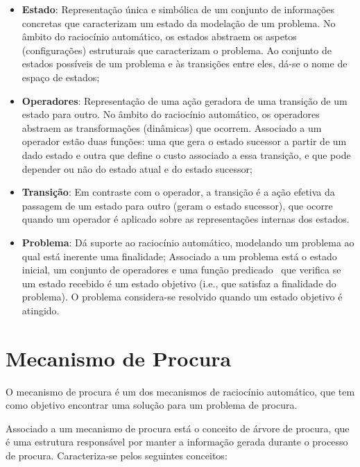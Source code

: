 \begin{itemize}
    \item \textbf{Estado}: Representação única e simbólica de um conjunto de informações concretas que caracterizam um estado da modelação de um problema. No âmbito do raciocínio automático, os estados abstraem os aspetos (configurações) estruturais que caracterizam o problema. Ao conjunto de estados possíveis de um problema e às transições entre eles, dá-se o nome de espaço de estados;
    \item \textbf{Operadores}: Representação de uma ação geradora de uma transição de um estado para outro.
    No âmbito do raciocínio automático, os operadores abstraem as transformações (dinâmicas) que ocorrem.
    Associado a um operador estão duas funções: uma que gera o estado sucessor a partir de um dado estado e outra que define o custo associado a essa transição, e que pode depender ou não do estado atual e do estado sucessor;
    \item \textbf{Transição}: Em contraste com o operador, a transição é a ação efetiva da passagem de um estado para outro (geram o estado sucessor), que ocorre quando um operador é aplicado sobre as representações internas dos estados.
    \item \textbf{Problema}: Dá suporte ao raciocínio automático, modelando um problema ao qual está inerente uma finalidade;
    Associado a um problema está o estado inicial, um conjunto de operadores e uma função predicado~\cite{stanford:fp:function-predicates} que verifica se um estado recebido é um estado objetivo (i.e., que satisfaz a finalidade do problema).
    O problema considera-se resolvido quando um estado objetivo é atingido.
\end{itemize}


\section{Mecanismo de Procura}\label{sec:mecanismo-procura}

O mecanismo de procura é um dos mecanismos de raciocínio automático, que tem como objetivo encontrar uma solução para um problema de procura.

Associado a um mecanismo de procura está o conceito de árvore de procura, que é uma estrutura responsável por manter a informação gerada durante o processo de procura.
Caracteriza-se pelos seguintes conceitos:

